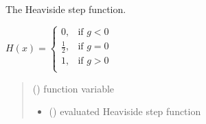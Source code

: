 \documentclass[letterpaper,10pt,english]{sphinxmanual}
\begin{document}

\begin{fulllineitems}
\label{\detokenize{01_utils:skinoptics.utils.heaviside}}
\pysigstartsignatures
{}
\pysigstopsignatures
\sphinxAtStartPar
The Heaviside step function.

\sphinxAtStartPar
\(H(x) =  
\left \{ \begin{matrix}
0, & \mbox{if } g < 0 \\
\frac{1}{2}, & \mbox{if } g = 0 \\
1, & \mbox{if } g > 0 \\
\end{matrix} \right.\)
\begin{quote}\begin{description}
\sphinxAtStartPar
{} () \textendash{} function variable

\sphinxAtStartPar
\begin{itemize}
\item {} 
\sphinxAtStartPar
{} () \textendash{} evaluated Heaviside step function

\end{itemize}


\end{description}\end{quote}

\end{fulllineitems}

\end{document}
